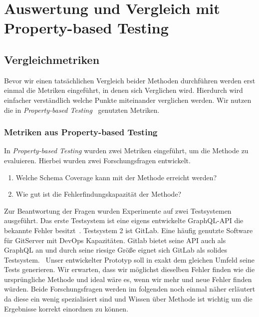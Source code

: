 \chapter{Auswertung und Vergleich mit Property-based Testing}
\label{experimente}

\section{Vergleichmetriken}
Bevor wir einen tatsächlichen Vergleich beider Methoden durchführen werden erst einmal die Metriken eingeführt, in denen sich Verglichen wird.
Hierdurch wird einfacher verständlich welche Punkte miteinander verglichen werden.
Wir nutzen die in \textit{Property-based Testing}~\cite{property-based-testing} genutzten Metriken.

\subsection{Metriken aus Property-based Testing}

In \textit{Property-based Testing} wurden zwei Metriken eingeführt, um die Methode zu evaluieren.
Hierbei wurden zwei Forschungsfragen entwickelt.

\begin{enumerate}
    \item Welche Schema Coverage kann mit der Methode erreicht werden?~\cite[vgl. RQ1]{property-based-testing}
    \item Wie gut ist die Fehlerfindungskapazität der Methode?~\cite[vgl. RQ2]{property-based-testing}
\end{enumerate}

Zur Beantwortung der Fragen wurden Experimente auf zwei Testsystemen ausgeführt.
Das erste Testsystem ist eine eigens entwickelte GraphQL-API die bekannte Fehler besitzt~\cite[vgl. A.1]{property-based-testing}.
Testsystem 2 ist GitLab.
Eine häufig genutzte Software für GitServer mit DevOps Kapazitäten.
Gitlab bietet seine API auch als GraphQL an und durch seine riesige Größe eignet sich GitLab als solides Testsystem.~\cite[vgl. A2]{property-based-testing}
Unser entwickelter Prototyp soll in exakt dem gleichen Umfeld seine Tests generieren.
Wir erwarten, dass wir möglichst dieselben Fehler finden wie die ursprüngliche Methode und ideal wäre es, wenn wir mehr und neue Fehler finden würden.
Beide Forschungsfragen werden im folgenden noch einmal näher erläutert da diese ein wenig spezialisiert sind und Wissen über Methode
ist wichtig um die Ergebnisse korrekt einordnen zu können.

